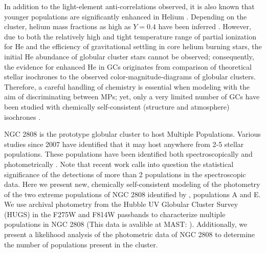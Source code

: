 In addition to the light-element anti-correlations observed, it is also known
that younger populations are significantly enhanced in Helium
\citep{Piotto2007, Piotto2015, Latour2019}. Depending on the cluster, helium
mass fractions as high as $Y=0.4$ have been inferred \citep[e.g][]{Milone2015}.
However, due to both the relatively high and tight temperature range of partial
ionization for He and the efficiency of gravitational settling in core helium
burning stars, the initial He abundance of globular cluster stars cannot be
observed; consequently, the evidence for enhanced He in GCs originates from
comparison of theoretical stellar isochrones to the observed
color-magnitude-diagrams of globular clusters. Therefore, a careful handling of
chemistry is essential when modeling with the aim of discriminating between
MPs; yet, only a very limited number of GCs have been studied with
chemically self-consistent (structure and atmosphere) isochrones
\citep[e.g.][NGC 6752]{Dotter2015}. 


NGC 2808 is the prototype globular cluster to host Multiple Populations.
Various studies since 2007 have identified that it may host anywhere from 2-5
stellar populations. These populations have been identified both
spectroscopically \citep[i.e.][]{Carretta2004, Carretta2006, Carretta2010, Gratton2011, Carretta2015, Hong2021} and photometrically \citep[i.e.][]{Piotto2007, Piotto2015, Milone2015, Milone2017, Pasquato2019}. Note
that recent work \citep{Valle2022} calls into question the statistical
significance of the detections of more than 2 populations in the spectroscopic
data. Here we present new, chemically self-consistent modeling of the
photometry of the two extreme populations of NGC 2808 identified by
\citet{Milone2015}, populations A and E. We use archival photometry from the
Hubble UV Globular Cluster Survey (HUGS) \citep{Piotto2015, Milone2017} in the
F275W and F814W passbands to characterize multiple populations in NGC 2808
\citep{Milone2015, Milone2015b} (This data is avalible at MAST: ). Additionally, we present a likelihood analysis of the
photometric data of NGC 2808 to determine the number of populations present in
the cluster.


